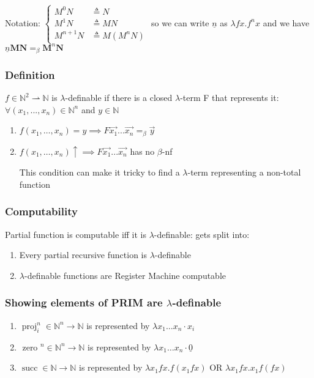 \documentclass{article}
\begin{document}
Notation: $\left\{\begin{array}{ll}{M^{0} N} & {\triangleq N} \\ {M^{1} N} & {\triangleq M N} \\ {M^{n+1} N} & {\triangleq M\left(M^{n} N\right)}\end{array}\right.$ so we can write $\underline{n}$ as $\lambda f x . f^{n} x$ and we have $\underline{n} \boldsymbol{M} \boldsymbol{N}=_{\beta} \boldsymbol{M}^{n} \boldsymbol{N}$

\subsubsection{Definition}
$f \in \mathbb{N}^{2} \rightharpoonup \mathbb{N}$ is $\lambda$-definable if there is a closed $\lambda$-term F that represents it: $\forall (x_{1}, ..., x_{n}) \in \mathbb{N}^{n}$ and $y \in \mathbb{N}$
\begin{enumerate}
    \item $f\left(x_{1}, \ldots, x_{n}\right)=y \implies F \vec{x_{1}} ... \vec{x_{n}} =_{\beta} \vec{y}$
    
    \item $f\left(x_{1}, \ldots, x_{n}\right) \uparrow \implies F \vec{x_{1}} ... \vec{x_{n}}$ has no $\beta$-nf
    
    \subitem This condition can make it tricky to find a $\lambda$-term representing a non-total function
\end{enumerate}

\subsubsection{Computability}
Partial function is computable iff it is $\lambda$-definable: gets split into:
\begin{enumerate}
    \item Every partial recursive function is $\lambda$-definable
    \item $\lambda$-definable functions are Register Machine computable
\end{enumerate}

\subsubsection{Showing elements of PRIM are $\lambda$-definable}
\begin{enumerate}
    \item $\operatorname{proj}_{i}^{n} \in \mathbb{N}^{n} \rightarrow \mathbb{N}$ is represented by $\lambda x_{1} \ldots x_{n} \cdot x_{i}$
    \item $\text { zero }^{n} \in \mathbb{N}^{n} \rightarrow \mathbb{N}$ is represented by $\lambda x_{1} \ldots x_{n} \cdot \underline{0}$
    \item $\operatorname{succ} \in \mathbb{N} \rightarrow \mathbb{N}$ is represented by $\lambda x_{1} f x . f\left(x_{1} f x\right)$ OR $\lambda x_{1} f x. x_{1} f (f x)$
\end{enumerate}
\end{document}
